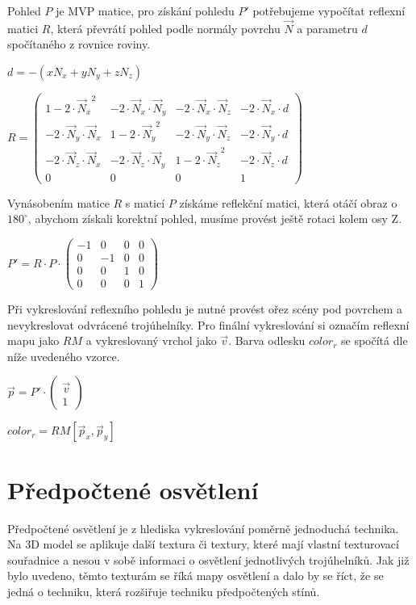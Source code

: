 \documentclass[11pt,twoside,a4paper]{book}
\begin{document}
Pohled $P$ je MVP matice, pro získání pohledu $P'$ potřebujeme vypočítat reflexní matici $R$, která převrátí pohled podle normály povrchu $\vec{N}$ a parametru $d$ spočítaného z rovnice roviny.
              
\begin{center}
$d = -(xN_x + yN_y + zN_z)$
\end{center}
\begin{center}
$R = \begin{pmatrix}
1 -2 \cdot {\vec{N}_x}^2 & -2 \cdot \vec{N}_x \cdot \vec{N}_y & -2 \cdot \vec{N}_x \cdot \vec{N}_z & -2 \cdot \vec{N}_x \cdot d\\
-2 \cdot \vec{N}_y \cdot \vec{N}_x & 1 -2 \cdot {\vec{N}_y}^2 & -2 \cdot \vec{N}_y \cdot \vec{N}_z & -2 \cdot \vec{N}_y \cdot d\\
-2 \cdot \vec{N}_z \cdot \vec{N}_x & -2 \cdot \vec{N}_z \cdot \vec{N}_y & 1 -2 \cdot {\vec{N}_z}^2 & -2 \cdot \vec{N}_z \cdot d\\
0 & 0 & 0 & 1
\end{pmatrix}$
\end{center}

Vynásobením matice $R$ s maticí $P$ získáme reflekční matici, která otáčí obraz o $180^{\circ}$, abychom získali korektní pohled, musíme provést ještě rotaci kolem osy Z.
\begin{center}
$P' = R \cdot P \cdot \begin{pmatrix}
-1 & 0 & 0 & 0\\
0 & -1 & 0 & 0\\
0 & 0 & 1 & 0\\
0 & 0 & 0 & 1
\end{pmatrix}$
\end{center}

Při vykreslování reflexního pohledu je nutné provést ořez scény pod povrchem a nevykreslovat odvrácené trojúhelníky. Pro finální vykreslování si označím reflexní mapu jako $RM$ a vykreslovaný vrchol jako $\vec{v}$. Barva odlesku $color_r$ se spočítá dle níže uvedeného vzorce.
\begin{center}
$\vec{p} = P' \cdot \begin{pmatrix}
\vec{v}\\
1
\end{pmatrix}$
\end{center}
\begin{center}
$color_r = RM[\vec{p}_x, \vec{p}_y]$
\end{center}

\chapter{Předpočtené osvětlení}
Předpočtené osvětlení je z hlediska vykreslování poměrně jednoduchá technika. Na 3D model se aplikuje další textura či textury, které mají vlastní texturovací souřadnice a nesou v sobě informaci o osvětlení jednotlivých trojúhelníků. Jak již bylo uvedeno, těmto texturám se říká mapy osvětlení a dalo by se říct, že se jedná o techniku, která rozšiřuje techniku předpočtených stínů.
\end{document}
